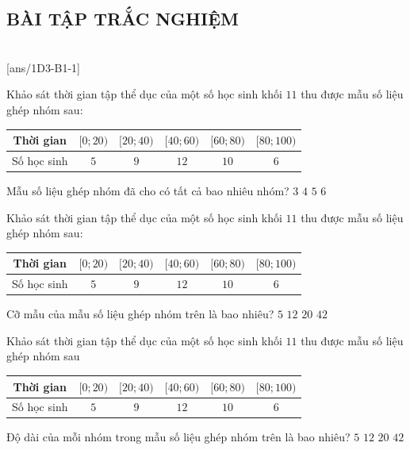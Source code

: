 \subsection{BÀI TẬP TRẮC NGHIỆM}
 \\
\setcounter{ex}{0}
[ans/1D3-B1-1]
\begin{ex}%
	Khảo sát thời gian tập thể dục của một số học sinh khối $11$ thu được mẫu số liệu ghép nhóm sau:
	\begin{center}
		\begin{tabular}{|c|c|c|c|c|c|}
			\hline Thời gian & {$[0 ; 20)$} & {$[20 ; 40)$} & {$[40 ; 60)$} & {$[60 ; 80)$} &  {$[80 ;100)$} \\
			\hline Số học sinh & $5$ & $9$ & $12$ & $10$ & $6$  \\
			\hline
		\end{tabular}
	\end{center}
	Mẫu số liệu ghép nhóm đã cho có tất cả bao nhiêu nhóm?
	\choice
	{$3$}
	{$4$}
	{\True $5$}
	{$6$}
\end{ex}

\begin{ex}%
	Khảo sát thời gian tập thể dục của một số học sinh khối $11$ thu được mẫu số liệu ghép nhóm sau:		
	\begin{center}
		\begin{tabular}{|c|c|c|c|c|c|}
			\hline Thời gian & {$[0 ; 20)$} & {$[20 ; 40)$} & {$[40 ; 60)$} & {$[60 ; 80)$} &  {$[80 ;100)$} \\
			\hline Số học sinh & $5$ & $9$ & $12$ & $10$ & $6$  \\
			\hline
		\end{tabular}
	\end{center}
	Cỡ mẫu của mẫu số liệu ghép nhóm trên là bao nhiêu?
	\choice
	{$5$}
	{$12$}
	{$20$}
	{\True $42$}
\end{ex}

\begin{ex}%
	Khảo sát thời gian tập thể dục của một số học sinh khối $11$ thu được mẫu số liệu ghép nhóm sau
	\begin{center}
		\begin{tabular}{|c|c|c|c|c|c|}
			\hline Thời gian & {$[0 ; 20)$} & {$[20 ; 40)$} & {$[40 ; 60)$} & {$[60 ; 80)$} &  {$[80 ;100)$} \\
			\hline Số học sinh & $5$ & $9$ & $12$ & $10$ & $6$  \\
			\hline
		\end{tabular}
	\end{center}
	Độ dài của mỗi nhóm trong mẫu số liệu ghép nhóm trên là bao nhiêu?
	\choice
	{$5$}
	{$12$}
	{\True $20$}
	{$42$}
\end{ex}


